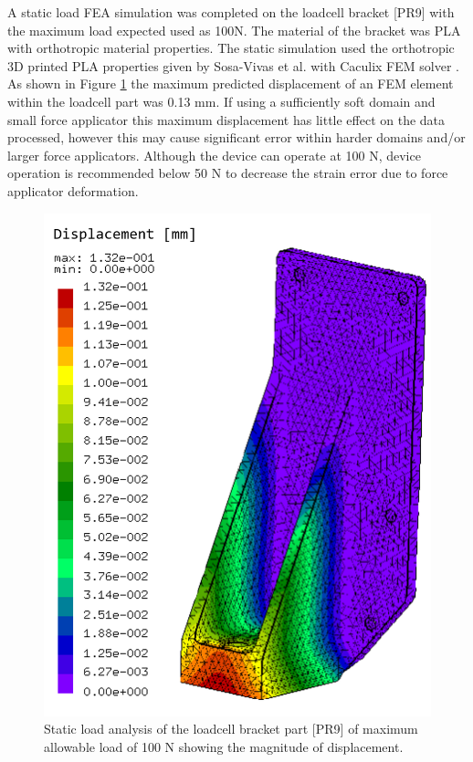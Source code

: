 A static load FEA simulation was completed on the loadcell bracket [PR9] with the maximum load expected used as 100N. The material of the bracket was PLA with orthotropic material properties. The static simulation used the orthotropic 3D printed PLA properties given by Sosa-Vivas et al. \cite{SosaVivas2023} with Caculix FEM solver \cite{Dhondt2023}. As shown in Figure \ref{fig:FEA_force_aplc} the maximum predicted displacement of an FEM element within the loadcell part was 0.13 mm. If using a sufficiently soft domain and small force applicator this maximum displacement has little effect on the data processed, however this may cause significant error within harder domains and/or larger force applicators. Although the device can operate at 100 N, device operation is recommended below 50 N to decrease the strain error due to force applicator deformation.


\begin{figure}[H]
\centering
\includegraphics[width=0.4\linewidth]{Figures/fea_ccx_loadcell_bracket.png}
\caption{Static load analysis of the loadcell bracket part [PR9] of maximum allowable load of 100 N showing the magnitude of displacement. }
\label{fig:FEA_force_aplc}
\end{figure}


